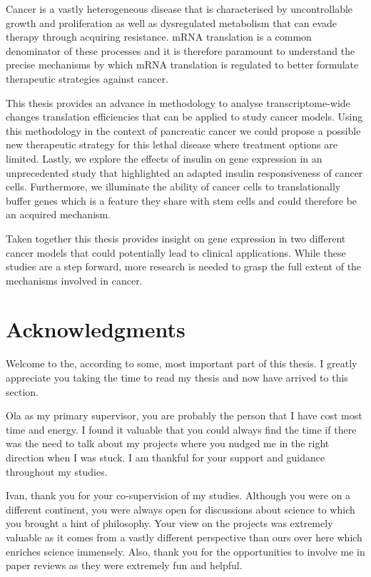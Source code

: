 \documentclass[
  12pt,
  openany]{book}
\begin{document}
Cancer is a vastly heterogeneous disease that is characterised by uncontrollable growth and proliferation as well as dysregulated metabolism that can evade therapy through acquiring resistance. mRNA translation is a common denominator of these processes and it is therefore paramount to understand the precise mechanisms by which mRNA translation is regulated to better formulate therapeutic strategies against cancer.

This thesis provides an advance in methodology to analyse transcriptome-wide changes translation efficiencies that can be applied to study cancer models. Using this methodology in the context of pancreatic cancer we could propose a possible new therapeutic strategy for this lethal disease where treatment options are limited. Lastly, we explore the effects of insulin on gene expression in an unprecedented study that highlighted an adapted insulin responsiveness of cancer cells. Furthermore, we illuminate the ability of cancer cells to translationally buffer genes which is a feature they share with stem cells and could therefore be an acquired mechanism.

Taken together this thesis provides insight on gene expression in two different cancer models that could potentially lead to clinical applications. While these studies are a step forward, more research is needed to grasp the full extent of the mechanisms involved in cancer.

\hypertarget{acknowledgments}{%
\chapter*{Acknowledgments}\label{acknowledgments}}

Welcome to the, according to some, most important part of this thesis. I greatly appreciate you taking the time to read my thesis and now have arrived to this section.

Ola as my primary supervisor, you are probably the person that I have cost most time and energy. I found it valuable that you could always find the time if there was the need to talk about my projects where you nudged me in the right direction when I was stuck. I am thankful for your support and guidance throughout my studies.

Ivan, thank you for your co-supervision of my studies. Although you were on a different continent, you were always open for discussions about science to which you brought a hint of philosophy. Your view on the projects was extremely valuable as it comes from a vastly different perspective than ours over here which enriches science immensely. Also, thank you for the opportunities to involve me in paper reviews as they were extremely fun and helpful.
\end{document}
